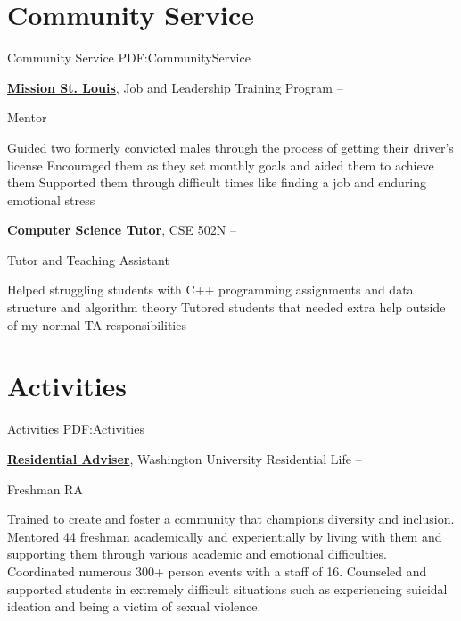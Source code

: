 \documentclass[a4paper,10pt,oneside]{article}
\begin{document}
\begin{body}

\section
{Community Service}
{Community Service}
{PDF:CommunityService}

\href{http://www.missionstl.org}
{\textbf{Mission St. Louis}}, Job and Leadership Training Program
\hfill
{} --
\par
Mentor
\begin{detail}
\BulletItem
Guided two formerly convicted males through the process of getting their driver's license
\BulletItem
Encouraged them as they set monthly goals and aided them to achieve them
\BulletItem
Supported them through difficult times like finding a job and enduring emotional stress
\end{detail}

\EntryGap
\textbf{Computer Science Tutor}, CSE 502N
\hfill
{} --
\par
Tutor and Teaching Assistant
\begin{detail}
\BulletItem
Helped struggling students with C++ programming assignments and data structure and algorithm theory
\BulletItem
Tutored students that needed extra help outside of my normal TA responsibilities
\end{detail}


\section
{Activities}
{Activities}
{PDF:Activities}

\href{http://reslife.wustl.edu}
{\textbf{Residential Adviser}}, Washington University Residential Life
\hfill
{} --
\par
Freshman RA
\begin{detail}
\BulletItem
Trained to create and foster a community that champions diversity and inclusion.
\BulletItem
Mentored 44 freshman academically and experientially by living with them and supporting them through various academic and emotional difficulties.
\BulletItem
Coordinated numerous 300+ person events with a staff of 16.
\BulletItem
Counseled and supported students in extremely difficult situations such as experiencing suicidal ideation and being a victim of sexual violence.
\end{detail}


\end{body}
\end{document}
